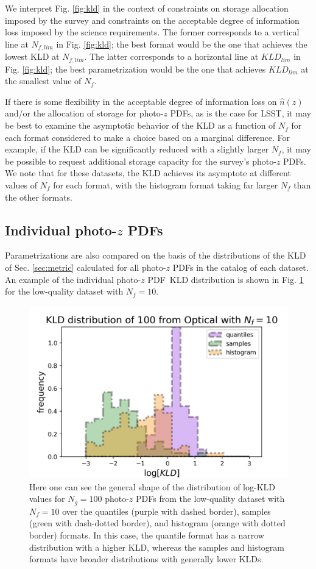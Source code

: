 \documentclass[\docopts]{\docclass}
\newcommand{\pz}{photo-$z$ PDF}
\begin{document}
We interpret Fig. \ref{fig:kld} in the context of constraints on storage
allocation imposed by the survey and constraints on the acceptable degree of
information loss imposed by the science requirements.  The former corresponds
to a vertical line at $N_{f, lim}$ in Fig. \ref{fig:kld}; the best format would
be the one that achieves the lowest KLD at $N_{f, lim}$.  The latter
corresponds to a horizontal line at $KLD_{lim}$ in Fig. \ref{fig:kld}; the best
parametrization would be the one that achieves $KLD_{lim}$ at the smallest
value of $N_{f}$.

If there is some flexibility in the acceptable degree of information loss on
$\hat{n}(z)$ and/or the allocation of storage for \pz s, as is the case for
LSST, it may be best to examine the asymptotic behavior of the KLD as a
function of $N_{f}$ for each format considered to make a choice based on a
marginal difference.  For example, if the KLD can be significantly reduced with
a slightly larger $N_{f}$, it may be possible to request additional storage
capacity for the survey's \pz s.  We note that for these datasets, the KLD
achieves its asymptote at different values of $N_{f}$ for each format, with the
histogram format taking far larger $N_{f}$ than the other formats.

\subsection{Individual \pz s}
\label{sec:individual_results}

Parametrizations are also compared on the basis of the distributions of the KLD
of Sec. \ref{sec:metric} calculated for all \pz s in the catalog of each
dataset.  An example of the individual \pz\ KLD distribution is shown in Fig.
\ref{fig:individual} for the low-quality dataset with $N_{f}=10$.

\begin{figure}
  \includegraphics[width=0.9\columnwidth]{figures/lsst_individual.png}
  \caption{Here one can see the general shape of the distribution of log-KLD
values for $N_{g}=100$ \pz s from the low-quality dataset with $N_{f}=10$ over
the quantiles (purple with dashed border), samples (green with dash-dotted
border), and histogram (orange with dotted border) formats.  In this case, the
quantile format has a narrow distribution with a higher KLD, whereas the
samples and histogram formats have broader distributions with generally lower
KLDs.
  \label{fig:individual}}
\end{figure}
\end{document}
